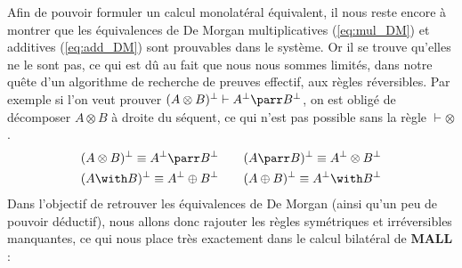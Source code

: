 \documentclass[12pt]{report}
\newcommand{\seq}{\vdash}
\newcommand{\irule}[1]{\footnotesize$#1$}
\newcommand{\iruleL}[1]{\irule{{#1}\seq}}
\newcommand{\iruleR}[1]{\irule{\seq{#1}}}
\begin{document}

Afin de pouvoir formuler un calcul monolatéral équivalent, il nous reste encore à montrer que les équivalences de De Morgan multiplicatives (\ref{eq:mul_DM}) et additives (\ref{eq:add_DM}) sont prouvables dans le système. Or il se trouve qu'elles ne le sont pas, ce qui est dû au fait que nous nous sommes limités, dans notre quête d'un algorithme de recherche de preuves effectif, aux règles réversibles. Par exemple si l'on veut prouver $(A \otimes B)^\bot \seq A^\bot \parr B^\bot$, on est obligé de décomposer $A \otimes B$ à droite du séquent, ce qui n'est pas possible sans la règle {\iruleR{\otimes}}.
\begin{align}
    (A \otimes B)^\bot \equiv A^\bot \parr B^\bot &\qquad (A \parr B)^\bot \equiv A^\bot \otimes B^\bot \label{eq:mul_DM} \\
    (A \with B)^\bot \equiv A^\bot \oplus B^\bot &\qquad (A \oplus B)^\bot \equiv A^\bot \with B^\bot \label{eq:add_DM}
\end{align}
Dans l'objectif de retrouver les équivalences de De Morgan (ainsi qu'un peu de pouvoir déductif), nous allons donc rajouter les règles symétriques et irréversibles manquantes, ce qui nous place très exactement dans le calcul bilatéral de $\mathbf{MALL}$ :
\end{document}
